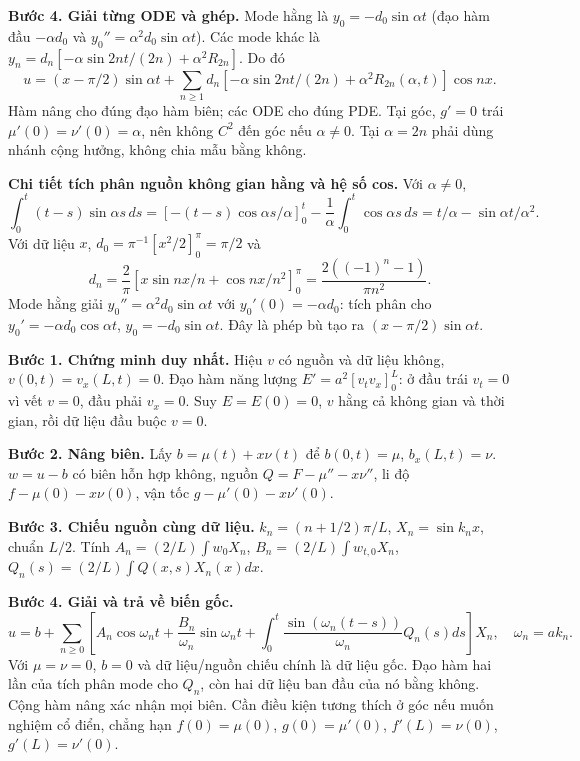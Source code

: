 \textbf{Bước 4. Giải từng ODE và ghép.} Mode hằng là $y_0=-d_0\sin\alpha t$ (đạo hàm đầu $-\alpha d_0$ và $y_0''=\alpha^2d_0\sin\alpha t$). Các mode khác là $y_n=d_n[-\alpha\sin2nt/(2n)+\alpha^2R_{2n}]$. Do đó
\[u=(x-\pi/2)\sin\alpha t+\sum_{n\ge1}d_n[-\alpha\sin2nt/(2n)+\alpha^2R_{2n}(\alpha,t)]\cos nx.\]
Hàm nâng cho đúng đạo hàm biên; các ODE cho đúng PDE. Tại góc, $g'=0$ trái $\mu'(0)=\nu'(0)=\alpha$, nên không $C^2$ đến góc nếu $\alpha\ne0$. Tại $\alpha=2n$ phải dùng nhánh cộng hưởng, không chia mẫu bằng không.

\textbf{Chi tiết tích phân nguồn không gian hằng và hệ số cos.} Với $\alpha\ne0$,
\[\int_0^t(t-s)\sin\alpha s\,ds
=\left[-(t-s)\cos\alpha s/\alpha\right]_0^t-\frac1\alpha\int_0^t\cos\alpha s\,ds
=t/\alpha-\sin\alpha t/\alpha^2.\]
Với dữ liệu $x$, $d_0=\pi^{-1}[x^2/2]_0^\pi=\pi/2$ và
\[d_n=\frac2\pi\left[x\sin nx/n+\cos nx/n^2\right]_0^\pi
=\frac{2((-1)^n-1)}{\pi n^2}.\]
Mode hằng giải $y_0''=\alpha^2d_0\sin\alpha t$ với $y_0'(0)=-\alpha d_0$: tích phân cho $y_0'=-\alpha d_0\cos\alpha t$, $y_0=-d_0\sin\alpha t$. Đây là phép bù tạo ra $(x-\pi/2)\sin\alpha t$.

\textbf{Bước 1. Chứng minh duy nhất.} Hiệu $v$ có nguồn và dữ liệu không, $v(0,t)=v_x(L,t)=0$. Đạo hàm năng lượng $E'=a^2[v_tv_x]_0^L$: ở đầu trái $v_t=0$ vì vết $v=0$, đầu phải $v_x=0$. Suy $E=E(0)=0$, $v$ hằng cả không gian và thời gian, rồi dữ liệu đầu buộc $v=0$.

\textbf{Bước 2. Nâng biên.} Lấy $b=\mu(t)+x\nu(t)$ để $b(0,t)=\mu$, $b_x(L,t)=\nu$. $w=u-b$ có biên hỗn hợp không, nguồn $Q=F-\mu''-x\nu''$, li độ $f-\mu(0)-x\nu(0)$, vận tốc $g-\mu'(0)-x\nu'(0)$.

\textbf{Bước 3. Chiếu nguồn cùng dữ liệu.} $k_n=(n+1/2)\pi/L$, $X_n=\sin k_nx$, chuẩn $L/2$. Tính $A_n=(2/L)\int w_0X_n$, $B_n=(2/L)\int w_{t,0}X_n$, $Q_n(s)=(2/L)\int Q(x,s)X_n(x)dx$.

\textbf{Bước 4. Giải và trả về biến gốc.}
\[u=b+\sum_{n\ge0}\left[A_n\cos\omega_nt+\frac{B_n}{\omega_n}\sin\omega_nt+\int_0^t\frac{\sin(\omega_n(t-s))}{\omega_n}Q_n(s)ds\right]X_n,\quad\omega_n=ak_n.\]
Với $\mu=\nu=0$, $b=0$ và dữ liệu/nguồn chiếu chính là dữ liệu gốc. Đạo hàm hai lần của tích phân mode cho $Q_n$, còn hai dữ liệu ban đầu của nó bằng không. Cộng hàm nâng xác nhận mọi biên. Cần điều kiện tương thích ở góc nếu muốn nghiệm cổ điển, chẳng hạn $f(0)=\mu(0)$, $g(0)=\mu'(0)$, $f'(L)=\nu(0)$, $g'(L)=\nu'(0)$.

